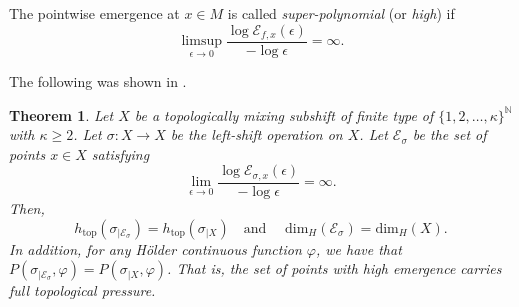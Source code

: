 \documentclass{amsart}
\theoremstyle{plain}
\newtheorem{thm}{Theorem}[section]
\theoremstyle{definition}
\theoremstyle{remark}
\numberwithin{equation}{section}
\begin{document}
The pointwise emergence at $x\in M$ is called \emph{super-polynomial} (or \emph{high})
 if 
\begin{equation}\label{eqn:high}
\limsup _{\epsilon \to 0}  \frac{\log \mathscr E_{f,x}(\epsilon ) }{-\log \epsilon } =\infty .
\end{equation}


The following was shown in \cite[Theorem 1.1]{NakZ}.
\begin{thm}\label{thm:mainNakZ}
Let $X $ be a topologically mixing subshift of finite type of $  \{ 1, 2, \ldots , \kappa\} ^{\mathbb N}$ with $\kappa\geq 2$. Let $\sigma:X \to X$ be the left-shift operation on $X$.  
 Let $\mathcal{E}_{\sigma}$ be the set of points $x\in X$ satisfying
 \begin{equation*}
 \lim _{\epsilon \to 0}  \frac{\log \mathscr E_{\sigma,x}(\epsilon ) }{-\log \epsilon } =\infty.
\end{equation*}
Then, 
\[
h_{\mathrm{top}} (\sigma_{|\mathcal{E}_{\sigma}}) =h_{\mathrm{top}} (\sigma_{|X})  \quad \text{and } \quad \mathrm{dim}_{H} (\mathcal{E}_{\sigma}) =\mathrm{dim}_{H} (X) .
\]
In addition, for any H\"older continuous function $\varphi$, we have that $P(\sigma_{|\mathcal{E}_{\sigma}}, \varphi)=P(\sigma_{|X},\varphi)$.
That is, the set of points with high emergence carries full topological pressure.
\end{thm}
\end{document}
